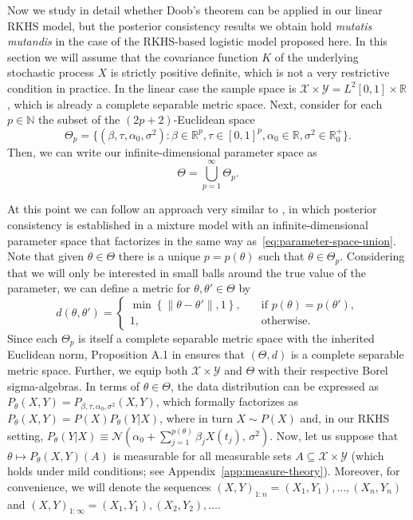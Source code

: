 \documentclass{article}
\numberwithin{equation}{section}
\theoremstyle{plain}
\newcommand{\N}{\mathbb{N}}
\newcommand{\R}{\mathbb{R}}
\begin{document}
Now we study in detail whether Doob's theorem can be applied in our linear RKHS model, but the posterior consistency results we obtain hold \textit{mutatis mutandis} in the case of the RKHS-based logistic model proposed here. In this section we will assume that the covariance function \(K\) of the underlying stochastic process \(X\) is strictly positive definite, which is not a very restrictive condition in practice. In the linear case the sample space is \(\mathcal X \times \mathcal Y = L^2[0,1]\times \R\), which is already a complete separable metric space. Next, consider for each \(p\in\N\) the subset of the \((2p+2)\)-Euclidean space
\[
  \Theta_p = \{(\beta, \tau, \alpha_0, \sigma^2): \beta \in \R^p, \tau \in [0,1]^p, \alpha_0\in \R, \sigma^2 \in \R^+_0\}.
\]
Then, we can write our infinite-dimensional parameter space as
\begin{equation}\label{eq:parameter-space-union}
  \Theta = \bigcup_{p=1}^\infty \Theta_p.
\end{equation}

At this point we can follow an approach very similar to \citet{miller2023consistency}, in which posterior consistency is established in a mixture model with an infinite-dimensional parameter space that factorizes in the same way as~\eqref{eq:parameter-space-union}. Note that given \(\theta \in \Theta\) there is a unique \(p=p(\theta)\) such that \(\theta \in \Theta_p\). Considering that we will only be interested in small balls around the true value of the parameter, we can define a metric for \(\theta, \theta' \in \Theta\) by
\[
  d(\theta, \theta')= \begin{cases}
    \min \left\{\|\theta - \theta'\|, 1\right\}, \quad & \text{if } p(\theta)=p(\theta'), \\
    1, \quad                                           & \text{otherwise}.
  \end{cases}
\]
Since each \(\Theta_p\) is itself a complete separable metric space with the inherited Euclidean norm, Proposition A.1 in \citet{miller2023consistency} ensures that \((\Theta, d)\) is a complete separable metric space. Further, we equip both \(\mathcal X \times \mathcal Y\) and \(\Theta\) with their respective Borel sigma-algebras. In terms of \(\theta\in\Theta\), the data distribution can be expressed as \(P_\theta(X,Y)=P_{\beta, \tau, \alpha_0, \sigma^2}(X,Y)\), which formally factorizes as \(P_{\theta}(X,Y)=P(X)P_\theta(Y|X)\), where in turn \(X \sim P(X)\) and, in our RKHS setting, \(P_\theta(Y|X) \equiv \mathcal N(\alpha_0 + \sum_{j=1}^{p(\theta)}\beta_j X(t_j),\, \sigma^2)\). Now, let us suppose that \(\theta\mapsto P_\theta(X, Y)(A)\) is measurable for all measurable sets \(A\subseteq \mathcal X\times \mathcal Y\) (which holds under mild conditions; see Appendix~\ref{app:measure-theory}). Moreover, for convenience, we will denote the sequences \((X,Y)_{1:n} = (X_1,Y_1), \dots, (X_n, Y_n)\) and \((X,Y)_{1:\infty} = (X_1, Y_1), (X_2, Y_2), \dots\).
\end{document}
